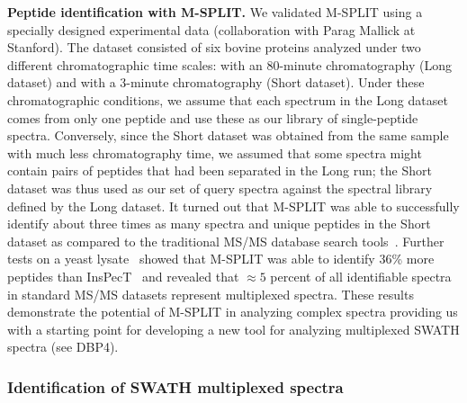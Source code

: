 \documentclass[arial,11pt]{article}
\begin{document}
{\bf Peptide identification with M-SPLIT.} We validated M-SPLIT using a specially designed experimental data (collaboration with Parag Mallick at Stanford).  The dataset consisted of six bovine proteins analyzed under two different chromatographic time scales:  with an 80-minute chromatography (Long dataset)  and  with a 3-minute chromatography (Short dataset).  Under these chromatographic conditions, we assume that each spectrum in the Long dataset comes from only one peptide and use these as our library of single-peptide spectra. Conversely, since the Short dataset was obtained from the same sample with much less chromatography time, we assumed that some spectra might contain pairs of peptides that had been separated in the Long run; the Short dataset was thus used as our set of query spectra against the spectral library defined by the Long dataset.
It turned out that M-SPLIT was able to successfully identify about three times as many spectra and unique peptides in the Short dataset as compared to the traditional MS/MS database search tools~\cite{wang2010msplit}.
Further tests on a yeast lysate~\cite{li2009} showed that M-SPLIT was able to identify 36\% more peptides than InsPecT~\cite{tanner05} and revealed that $\approx 5$ percent of all identifiable spectra in standard MS/MS datasets represent multiplexed spectra. %
These results demonstrate  the potential of M-SPLIT in analyzing  complex spectra providing us with a starting point for developing a new tool for analyzing multiplexed SWATH spectra (see DBP4).


\subsubsection{Identification of SWATH multiplexed spectra}
\end{document}
